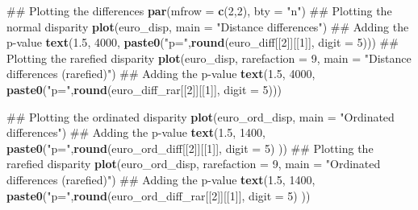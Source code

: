 \documentclass[]{book}
\newenvironment{Shaded}{\begin{snugshade}}{\end{snugshade}}
\newcommand{\KeywordTok}[1]{\textcolor[rgb]{0.13,0.29,0.53}{\textbf{#1}}}
\newcommand{\DataTypeTok}[1]{\textcolor[rgb]{0.13,0.29,0.53}{#1}}
\newcommand{\DecValTok}[1]{\textcolor[rgb]{0.00,0.00,0.81}{#1}}
\newcommand{\FloatTok}[1]{\textcolor[rgb]{0.00,0.00,0.81}{#1}}
\newcommand{\StringTok}[1]{\textcolor[rgb]{0.31,0.60,0.02}{#1}}
\newcommand{\NormalTok}[1]{#1}
\theoremstyle{definition}
\theoremstyle{definition}
\theoremstyle{definition}
\theoremstyle{remark}
\begin{document}
\begin{Shaded}
\begin{Highlighting}[]
\NormalTok{## Plotting the differences}
\KeywordTok{par}\NormalTok{(}\DataTypeTok{mfrow =} \KeywordTok{c}\NormalTok{(}\DecValTok{2}\NormalTok{,}\DecValTok{2}\NormalTok{), }\DataTypeTok{bty =} \StringTok{"n"}\NormalTok{)}
\NormalTok{## Plotting the normal disparity}
\KeywordTok{plot}\NormalTok{(euro_disp, }\DataTypeTok{main =} \StringTok{"Distance differences"}\NormalTok{)}
\NormalTok{## Adding the p-value}
\KeywordTok{text}\NormalTok{(}\FloatTok{1.5}\NormalTok{, }\DecValTok{4000}\NormalTok{, }\KeywordTok{paste0}\NormalTok{(}\StringTok{"p="}\NormalTok{,}\KeywordTok{round}\NormalTok{(euro_diff[[}\DecValTok{2}\NormalTok{]][[}\DecValTok{1}\NormalTok{]], }\DataTypeTok{digit =} \DecValTok{5}\NormalTok{)))}
\NormalTok{## Plotting the rarefied disparity}
\KeywordTok{plot}\NormalTok{(euro_disp, }\DataTypeTok{rarefaction =} \DecValTok{9}\NormalTok{, }\DataTypeTok{main =} \StringTok{"Distance differences (rarefied)"}\NormalTok{)}
\NormalTok{## Adding the p-value}
\KeywordTok{text}\NormalTok{(}\FloatTok{1.5}\NormalTok{, }\DecValTok{4000}\NormalTok{, }\KeywordTok{paste0}\NormalTok{(}\StringTok{"p="}\NormalTok{,}\KeywordTok{round}\NormalTok{(euro_diff_rar[[}\DecValTok{2}\NormalTok{]][[}\DecValTok{1}\NormalTok{]], }\DataTypeTok{digit =} \DecValTok{5}\NormalTok{)))}

\NormalTok{## Plotting the ordinated disparity}
\KeywordTok{plot}\NormalTok{(euro_ord_disp, }\DataTypeTok{main =} \StringTok{"Ordinated differences"}\NormalTok{)}
\NormalTok{## Adding the p-value}
\KeywordTok{text}\NormalTok{(}\FloatTok{1.5}\NormalTok{, }\DecValTok{1400}\NormalTok{, }\KeywordTok{paste0}\NormalTok{(}\StringTok{"p="}\NormalTok{,}\KeywordTok{round}\NormalTok{(euro_ord_diff[[}\DecValTok{2}\NormalTok{]][[}\DecValTok{1}\NormalTok{]], }\DataTypeTok{digit =} \DecValTok{5}\NormalTok{) ))}
\NormalTok{## Plotting the rarefied disparity}
\KeywordTok{plot}\NormalTok{(euro_ord_disp, }\DataTypeTok{rarefaction =} \DecValTok{9}\NormalTok{, }\DataTypeTok{main =} \StringTok{"Ordinated differences (rarefied)"}\NormalTok{)}
\NormalTok{## Adding the p-value}
\KeywordTok{text}\NormalTok{(}\FloatTok{1.5}\NormalTok{, }\DecValTok{1400}\NormalTok{, }\KeywordTok{paste0}\NormalTok{(}\StringTok{"p="}\NormalTok{,}\KeywordTok{round}\NormalTok{(euro_ord_diff_rar[[}\DecValTok{2}\NormalTok{]][[}\DecValTok{1}\NormalTok{]], }\DataTypeTok{digit =} \DecValTok{5}\NormalTok{) ))}
\end{Highlighting}
\end{Shaded}
\end{document}

